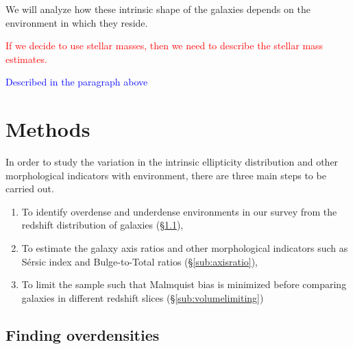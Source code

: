 \documentclass[twocolumn,useAMS,usenatbib]{mn2e}
\newcommand{\rachel}[1]{{\textcolor{red}{#1}}}
\newcommand{\arun}[1]{{\textcolor{blue}{#1}}}
\newcommand{\sersic}{S\'{e}rsic }
\begin{document}
We will analyze how these intrinsic shape of the galaxies depends on
the environment in which they reside.

\rachel{If we decide to use stellar masses, then we need to describe
  the stellar mass estimates.}

\arun{Described in the paragraph above}
\section{Methods}
\label{S:methods}

In order to study the variation in the intrinsic ellipticity distribution and other morphological indicators with environment, there are three main steps to be carried out.
\begin{enumerate}
 \item To identify overdense and underdense environments in our survey from the redshift distribution of galaxies (\S\ref{sub:overdensities}),
 \item To estimate the galaxy axis ratios and other morphological indicators such as  \sersic index and Bulge-to-Total ratios (\S\ref{sub:axisratio}),
 \item To limit the sample such that Malmquist bias is minimized before comparing galaxies in different redshift slices (\S\ref{sub:volumelimiting})
\end{enumerate}


\subsection{Finding overdensities}
\label{sub:overdensities}

\end{document}

